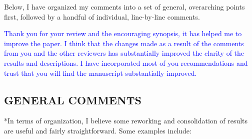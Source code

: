 \documentclass[draft]{agujournal2019}
\begin{document}
Below, I have organized my comments into a set of general, overarching points first, followed by a handful of individual, line-by-line comments.

\textcolor{blue}{Thank you for your review and the encouraging synopsis, it has helped me to improve the paper.  I think that 
the changes made as a result of the comments from you and the other reviewers has substantially improved the clarity of the 
results and descriptions.  I have incorporated most of you recommendations and trust that you will find the manuscript substantially 
improved.}

\subsection{GENERAL COMMENTS}
*In terms of organization, I believe some reworking and consolidation of results are useful and fairly straightforward. Some examples include:
\end{document}
